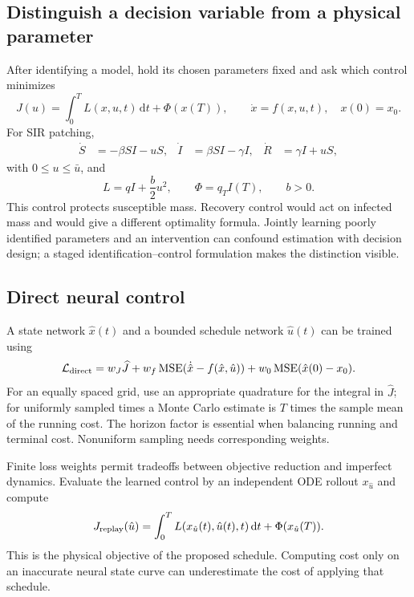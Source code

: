 \documentclass[11pt,a4paper]{article}
\newcommand{\dd}{\,\mathrm{d}}
\theoremstyle{definition}
\theoremstyle{remark}
\begin{document}
\subsection{Distinguish a decision variable from a physical parameter}
After identifying a model, hold its chosen parameters fixed and ask which control minimizes
\begin{equation}
J(u)=\int_0^T L(x,u,t)\dd t+\Phi(x(T)),\qquad
\dot x=f(x,u,t),\quad x(0)=x_0.
\end{equation}
For SIR patching,
\begin{align}
\dot S&=-\beta SI-uS, &
\dot I&=\beta SI-\gamma I, &
\dot R&=\gamma I+uS,
\label{eq:controlled-sir}
\end{align}
with $0\le u\le\bar u$, and
\begin{equation}
L=qI+\frac{b}{2}u^2,\qquad \Phi=q_TI(T),\qquad b>0.
\label{eq:control-objective}
\end{equation}
This control protects susceptible mass. Recovery control would act on infected mass and would give a different optimality formula. Jointly learning poorly identified parameters and an intervention can confound estimation with decision design; a staged identification--control formulation makes the distinction visible.

\subsection{Direct neural control}
A state network $\hat x(t)$ and a bounded schedule network $\hat u(t)$ can be trained using
\begin{equation}
\mathcal L_{\rm direct}=w_J\widehat J+w_f\operatorname{MSE}(\dot{\hat x}-f(\hat x,\hat u))
+w_0\operatorname{MSE}(\hat x(0)-x_0).
\end{equation}
For an equally spaced grid, use an appropriate quadrature for the integral in $\widehat J$; for uniformly sampled times a Monte Carlo estimate is $T$ times the sample mean of the running cost. The horizon factor is essential when balancing running and terminal cost. Nonuniform sampling needs corresponding weights.

Finite loss weights permit tradeoffs between objective reduction and imperfect dynamics. Evaluate the learned control by an independent ODE rollout $x_{\hat u}$ and compute
\begin{equation}
J_{\rm replay}(\hat u)=\int_0^T L(x_{\hat u}(t),\hat u(t),t)\dd t+\Phi(x_{\hat u}(T)).
\label{eq:replay-objective}
\end{equation}
This is the physical objective of the proposed schedule. Computing cost only on an inaccurate neural state curve can underestimate the cost of applying that schedule.
\end{document}
